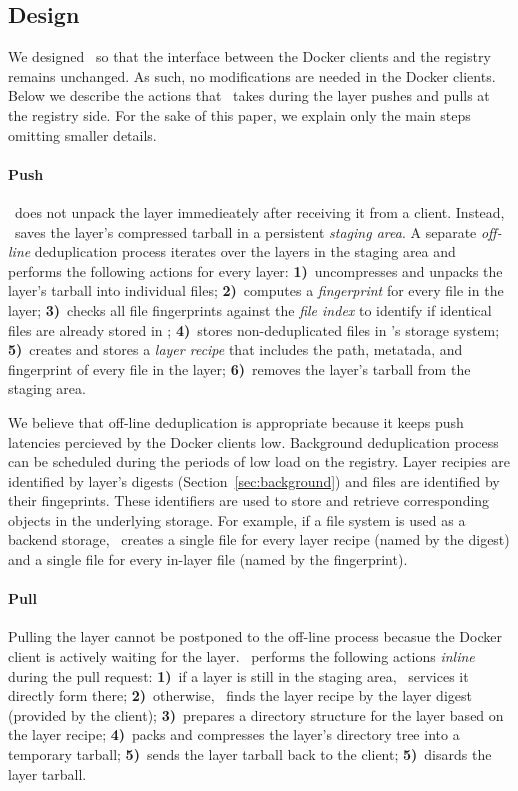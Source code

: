 \subsection{Design}
\label{sec:design}

We designed \sysname\ so that the interface between the Docker clients and the
registry remains unchanged.
%
As such, no modifications are needed in the Docker clients.
%
Below we describe the actions that \sysname\ takes during the layer pushes and
pulls at the registry side.
%
For the sake of this paper, we explain only the main steps omitting smaller
details.

\paragraph{Push}
%
\sysname\ does not unpack the layer immedieately after receiving it from a
client.
%
Instead, \sysname\ saves the layer's compressed tarball in a persistent
\emph{staging area}.
%
A separate \emph{off-line} deduplication process iterates over the layers in
the staging area and performs the following actions for every layer:
%
\textbf{1)}~uncompresses and unpacks the layer's tarball into individual files;
%
\textbf{2)}~computes a \emph{fingerprint} for every file in the layer;
%
\textbf{3)}~checks all file fingerprints against the \emph{file index} to
identify if identical files are already stored in \sysname;
%
\textbf{4)}~stores non-deduplicated files in \sysname's storage system;
%
\textbf{5)}~creates and stores a \emph{layer recipe} that includes the path,
metatada, and fingerprint of every file in the layer;
%
\textbf{6)}~removes the layer's tarball from the staging area.

We believe that off-line deduplication is appropriate because it keeps push
latencies percieved by the Docker clients low.
%
Background deduplication process can be scheduled during the periods of low
load on the registry.
%
Layer recipies are identified by layer's digests (Section~\ref{sec:background})
and files are identified by their fingeprints.
%
These identifiers are used to store and retrieve corresponding objects in the
underlying storage.
%
For example, if a file system is used as a backend storage, \sysname\ creates a
single file for  every layer recipe (named by the digest) and a single file for
every in-layer file (named by the fingerprint).


\paragraph{Pull}
%
Pulling the layer cannot be postponed to the off-line process becasue the
Docker client is actively waiting for the layer. 
%
\sysname\ performs the following actions \emph{inline} during the pull request:
%
\textbf{1)}~if a layer is still in the staging area, \sysname\ services it
directly form there;
%
\textbf{2)}~otherwise, \sysname\ finds the layer recipe by the layer digest
(provided by the client);
%
\textbf{3)}~prepares a directory structure for the layer based on the layer
recipe;
%
\textbf{4)}~packs and compresses the layer's  directory tree into a temporary
tarball;
%
\textbf{5)}~sends the layer tarball back to the client;
%
\textbf{5)}~disards the layer tarball.

